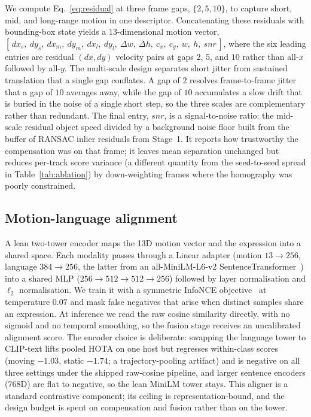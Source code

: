 \documentclass[sigconf,review,anonymous]{acmart}
\begin{document}
We compute Eq.~\ref{eq:residual} at three frame gaps, $\{2,5,10\}$, to capture short, mid, and long-range motion in one descriptor. Concatenating these residuals with bounding-box state yields a 13-dimensional motion vector, $[\,\mathit{dx}_s,\ \mathit{dy}_s,\ \mathit{dx}_m,\ \mathit{dy}_m,\ \mathit{dx}_l,\ \mathit{dy}_l,\ \Delta w,\ \Delta h,\ c_x,\ c_y,\ w,\ h,\ \mathit{snr}\,]$, where the six leading entries are residual $(\mathit{dx},\mathit{dy})$ velocity pairs at gaps $2$, $5$, and $10$ rather than all-$x$ followed by all-$y$. The multi-scale design separates short jitter from sustained translation that a single gap conflates. A gap of $2$ resolves frame-to-frame jitter that a gap of $10$ averages away, while the gap of $10$ accumulates a slow drift that is buried in the noise of a single short step, so the three scales are complementary rather than redundant. The final entry, $\mathit{snr}$, is a signal-to-noise ratio: the mid-scale residual object speed divided by a background noise floor built from the buffer of RANSAC inlier residuals from Stage~1. It reports how trustworthy the compensation was on that frame; it leaves mean separation unchanged but reduces per-track score variance (a different quantity from the seed-to-seed spread in Table~\ref{tab:ablation}) by down-weighting frames where the homography was poorly constrained.

\subsection{Motion-language alignment}
\label{sec:align}

A lean two-tower encoder maps the 13D motion vector and the expression into a shared space. Each modality passes through a Linear adapter (motion $13\!\to\!256$, language $384\!\to\!256$, the latter from an all-MiniLM-L6-v2 SentenceTransformer~\cite{sbert}) into a shared MLP ($256\!\to\!512\!\to\!512\!\to\!256$) followed by layer normalisation and $\ell_2$ normalisation. We train it with a symmetric InfoNCE objective~\cite{infonce} at temperature $0.07$ and mask false negatives that arise when distinct samples share an expression. At inference we read the raw cosine similarity directly, with no sigmoid and no temporal smoothing, so the fusion stage receives an uncalibrated alignment score. The encoder choice is deliberate: swapping the language tower to CLIP-text lifts pooled HOTA on one host but regresses within-class scores (moving $-1.03$, static $-1.74$; a trajectory-pooling artifact) and is negative on all three settings under the shipped raw-cosine pipeline, and larger sentence encoders (768D) are flat to negative, so the lean MiniLM tower stays. This aligner is a standard contrastive component; its ceiling is representation-bound, and the design budget is spent on compensation and fusion rather than on the tower.
\end{document}
